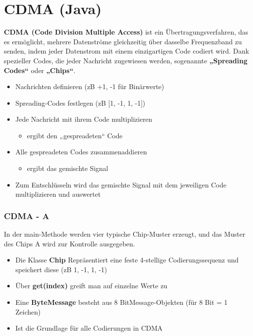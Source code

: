 \chapter{CDMA (Java)}
\textbf{CDMA (Code Division Multiple Access)} ist ein Übertragungsverfahren, das es ermöglicht, mehrere Datenströme gleichzeitig über dasselbe Frequenzband zu senden, indem jeder Datenstrom mit einem einzigartigen Code codiert wird. Dank spezieller Codes, die jeder Nachricht zugewiesen werden, sogenannte \textbf{„Spreading Codes“} oder \textbf{„Chips“}.
\begin{itemize}[itemsep=0pt]
   \item Nachrichten definieren (\ac{zB} +1, -1 für Binärwerte)
   \item Spreading-Codes festlegen (\ac{zB} [1, -1, 1, -1])
   \item Jede Nachricht mit ihrem Code multiplizieren 
   \begin{itemize}
    \item ergibt den „gespreadeten“ Code
   \end{itemize}
   \item Alle gespreadeten Codes zusammenaddieren 
   \begin{itemize}
    \item ergibt das gemischte Signal
   \end{itemize}
   \item Zum Entschlüsseln wird das gemischte Signal mit dem jeweiligen Code multiplizieren und auswertet
\end{itemize}

\subsection*{CDMA - A}
In der main-Methode werden vier typische Chip-Muster erzeugt, und das Muster des Chips A wird zur Kontrolle ausgegeben.
\begin{itemize}[itemsep=0pt]
   \item Die Klasse \textbf{Chip} Repräsentiert eine feste 4-stellige Codierungssequenz und speichert diese (\ac{zB} 1, -1, 1, -1)
   \item Über \textbf{get(index)} greift man auf einzelne Werte zu
   \item Eine \textbf{ByteMessage} besteht aus 8 BitMessage-Objekten (für 8 Bit = 1 Zeichen)
   \item Ist die Grundlage für alle Codierungen in CDMA
\end{itemize}
\begin{codeblock}
    
\end{codeblock}


